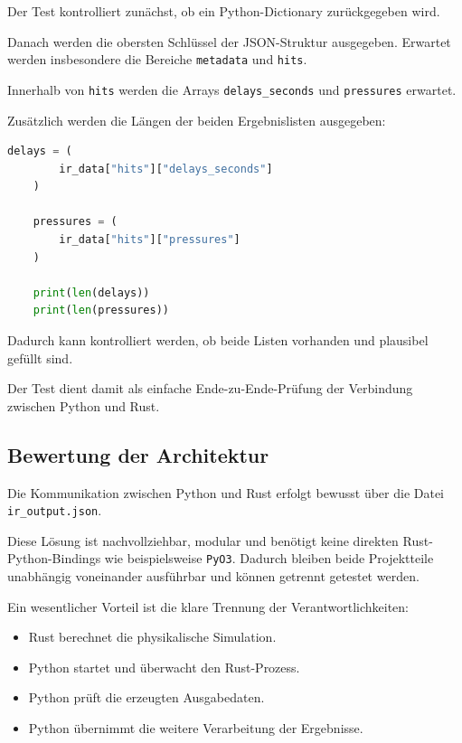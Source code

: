 \documentclass{article}
\begin{document}
    Der Test kontrolliert zunächst, ob ein Python-Dictionary zurückgegeben wird.

    Danach werden die obersten Schlüssel der JSON-Struktur ausgegeben. Erwartet
    werden insbesondere die Bereiche \texttt{metadata} und \texttt{hits}.

    Innerhalb von \texttt{hits} werden die Arrays
    \texttt{delays\_seconds} und \texttt{pressures} erwartet.

    Zusätzlich werden die Längen der beiden Ergebnislisten ausgegeben:

    \begin{lstlisting}[language=Python]
    delays = (
        ir_data["hits"]["delays_seconds"]
    )

    pressures = (
        ir_data["hits"]["pressures"]
    )

    print(len(delays))
    print(len(pressures))
    \end{lstlisting}

    Dadurch kann kontrolliert werden, ob beide Listen vorhanden und plausibel
    gefüllt sind.

    Der Test dient damit als einfache Ende-zu-Ende-Prüfung der Verbindung zwischen
    Python und Rust.

    \subsection{Bewertung der Architektur}
    \label{subsec:architecture-evaluation}

    Die Kommunikation zwischen Python und Rust erfolgt bewusst über die Datei
    \texttt{ir\_output.json}.

    Diese Lösung ist nachvollziehbar, modular und benötigt keine direkten
    Rust-Python-Bindings wie beispielsweise \texttt{PyO3}. Dadurch bleiben beide
    Projektteile unabhängig voneinander ausführbar und können getrennt getestet
    werden.

    Ein wesentlicher Vorteil ist die klare Trennung der Verantwortlichkeiten:

    \begin{itemize}
        \item Rust berechnet die physikalische Simulation.
        \item Python startet und überwacht den Rust-Prozess.
        \item Python prüft die erzeugten Ausgabedaten.
        \item Python übernimmt die weitere Verarbeitung der Ergebnisse.
    \end{itemize}
\end{document}
